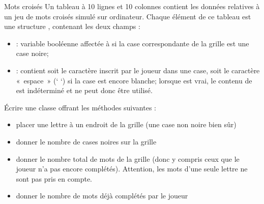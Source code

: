 \begin{Exercice}{Mots croisés}
	Un tableau  à 10 lignes et 10 colonnes contient les données
	relatives à un jeu de mots croisés simulé sur ordinateur. Chaque
	élément de ce tableau est une structure ,
	contenant les deux champs :

	\begin{itemize}
		\item 
			 : variable booléenne affectée à
			 si la case correspondante de la grille est une
			case noire;
		\item 
			 : contient soit le caractère inscrit par le
			joueur dans une case, soit le caractère «~espace~» (‘ ‘) si la case est
			encore blanche; lorsque  est vrai, le contenu
			de  est indéterminé et ne peut donc être
			utilisé. 
	\end{itemize}
	
	Écrire une classe  offrant les méthodes
	suivantes :

	\begin{itemize}
		\item 
			placer une lettre à un endroit de la grille (une case non noire bien
			sûr)
		\item 
			donner le nombre de cases noires sur la grille
		\item 
			donner le nombre total de mots de la grille (donc y compris ceux que le
			joueur n’a pas encore complétés). Attention, les mots
			d'une seule lettre ne sont pas pris en compte.
		\item 
			donner le nombre de mots déjà complétés par le joueur
	\end{itemize}


\end{Exercice}
